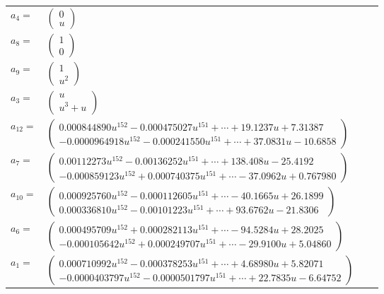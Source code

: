 \documentclass[1p]{elsarticle_modified}
\theoremstyle{definition}
\begin{document}
\begin{tabular}{m{7pt} m{180pt} m{7pt} m{180pt} }
\flushright $a_{4}=$&$\begin{pmatrix}0\\u\end{pmatrix}$ \\
\flushright $a_{8}=$&$\begin{pmatrix}1\\0\end{pmatrix}$ \\
\flushright $a_{9}=$&$\begin{pmatrix}1\\u^2\end{pmatrix}$ \\
\flushright $a_{3}=$&$\begin{pmatrix}u\\u^3+u\end{pmatrix}$ \\
\flushright $a_{12}=$&$\begin{pmatrix}0.000844890 u^{152}-0.000475027 u^{151}+\cdots+19.1237 u+7.31387\\-0.0000964918 u^{152}-0.000241550 u^{151}+\cdots+37.0831 u-10.6858\end{pmatrix}$ \\
\flushright $a_{7}=$&$\begin{pmatrix}0.00112273 u^{152}-0.00136252 u^{151}+\cdots+138.408 u-25.4192\\-0.000859123 u^{152}+0.000740375 u^{151}+\cdots-37.0962 u+0.767980\end{pmatrix}$ \\
\flushright $a_{10}=$&$\begin{pmatrix}0.000925760 u^{152}-0.000112605 u^{151}+\cdots-40.1665 u+26.1899\\0.000336810 u^{152}-0.00101223 u^{151}+\cdots+93.6762 u-21.8306\end{pmatrix}$ \\
\flushright $a_{6}=$&$\begin{pmatrix}0.000495709 u^{152}+0.000282113 u^{151}+\cdots-94.5284 u+28.2025\\-0.000105642 u^{152}+0.000249707 u^{151}+\cdots-29.9100 u+5.04860\end{pmatrix}$ \\
\flushright $a_{1}=$&$\begin{pmatrix}0.000710992 u^{152}-0.000378253 u^{151}+\cdots+4.68980 u+5.82071\\-0.0000403797 u^{152}-0.0000501797 u^{151}+\cdots+22.7835 u-6.64752\end{pmatrix}$ \\

\end{tabular}
\end{document}
